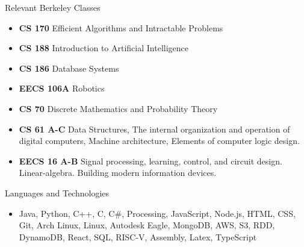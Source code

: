 \documentclass[]{mcdowellcv}
\begin{document}
        \begin{cvsection}{Relevant Berkeley Classes}
            \begin{cvsubsection}{}{}{}
    			\begin{itemize}

                        \item \textbf{CS 170} Efficient Algorithms and Intractable Problems
                    
    				\item \textbf{CS 188} Introduction to Artificial Intelligence

                        \item \textbf{CS 186} Database Systems

                        \item \textbf{EECS 106A} Robotics
        
    				\item \textbf{CS 70} Discrete Mathematics and Probability Theory
    
    				\item \textbf{CS 61 A-C} Data Structures, The internal organization and operation of digital computers, Machine architecture, Elements of computer logic design.
        
    				\item  \textbf{EECS 16 A-B} Signal processing, learning, control, and circuit design. Linear-algebra. Building modern information devices.
        
    			\end{itemize}
            \end{cvsubsection}
        \end{cvsection}

        \begin{cvsection}{Languages and Technologies}
            \begin{cvsubsection}{}{}{}	
                \begin{itemize}
                    \item Java, Python, C++, C, C\#, Processing, JavaScript, Node.js, HTML, CSS, Git, Arch Linux, Linux, Autodesk Eagle, MongoDB, AWS, S3, RDD, DynamoDB, React, SQL, RISC-V, Assembly, Latex, TypeScript
                \end{itemize}
            \end{cvsubsection}
        \end{cvsection}
	
\end{document}
